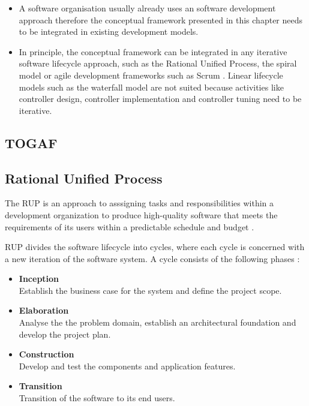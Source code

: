 \begin{itemize}
	\item A software organisation usually already uses an software development approach therefore the conceptual framework presented in this chapter needs to be integrated in existing development models.
	\item In principle, the conceptual framework can be integrated in any iterative software lifecycle approach, such as the Rational Unified Process, the spiral model \citep{Boehm:1988cd} or agile development frameworks such as Scrum \citep{Schwaber:2013aa}. Linear lifecycle models such as the waterfall model \citep{Royce:1987tl} are not suited because activities like controller design, controller implementation and controller tuning need to be iterative.
\end{itemize}

\subsection{TOGAF}

\subsection{Rational Unified Process}
The \ac{RUP} is an approach to asssigning tasks and responsibilities within a development organization to produce high-quality software that meets the requirements of its users within a predictable schedule and budget \citep{Rational:2001aa}.

\ac{RUP} divides the software lifecycle into cycles, where each cycle is concerned with a new iteration of the software system. A cycle consists of the following phases \citep{Kruchten:1996aa}:

\begin{itemize}
	\item \textbf{Inception}\\
	Establish the business case for the system and define the project scope.
	\item \textbf{Elaboration}\\
	Analyse the the problem domain, establish an architectural foundation and develop the project plan.
	\item \textbf{Construction}\\
	Develop and test the components and application features.
	\item \textbf{Transition}\\
	Transition of the software to its end users.
\end{itemize}

